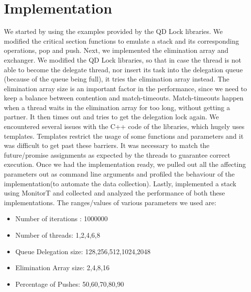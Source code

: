 \section{Implementation}
We started by using the examples provided by the QD Lock libraries. We modified the critical section functions to emulate a stack and its corresponding operations, pop and push. 
Next, we implemented the elimination array and exchanger. We modified the QD Lock libraries, so that in case the thread is not able to become the delegate thread, nor insert its task into the delegation queue (because of the queue being full), it tries the elimination array instead. The elimination array size is an important factor in the performance, since we need to keep a balance between contention and match-timeouts. Match-timeouts happen when a thread waits in the elimination array for too long, without getting a partner. It then times out and tries to get the delegation lock again.
We encountered several issues with the C++ code of the libraries, which hugely uses templates. Templates restrict the usage of some functions and parameters and it was difficult to get past these barriers. It was necessary to match the future/promise assignments as expected by the threads to guarantee correct execution.
Once we had the implementation ready, we pulled out all the affecting parameters out as command line arguments and profiled the behaviour of the implementation(to automate the data collection). Lastly, implemented a stack using MonitorT and collected and analyzed the performance of both these implementations.
The ranges/values of various parameters we used are:
\begin{itemize}
\item Number of iterations : 1000000
\item Number of threads: 1,2,4,6,8
\item Queue Delegation size: 128,256,512,1024,2048
\item Elimination Array size: 2,4,8,16
\item Percentage of Pushes: 50,60,70,80,90
\end{itemize}

